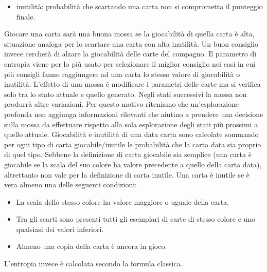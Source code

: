 \documentclass{article}
\begin{document}
\begin{flushleft}
\begin{itemize}
    \item inutilità: probabilità che scartando una carta non si comprometta il punteggio finale.
\end{itemize}
Giocare una carta sarà una buona mossa se la giocabilità di quella carta è alta, situazione analoga per lo scartare una carta con alta inutilità. Un buon consiglio invece cercherà di alzare la giocabilità delle carte del compagno. Il parametro di entropia viene per lo più usato per selezionare il miglior consiglio nei casi in cui più consigli fanno raggiungere ad una carta lo stesso valore di giocabilità o inutilità.\newline
\newline
L'effetto di una mossa è modificare i parametri delle carte ma si verifica solo tra lo stato attuale e quello generato. Negli stati successivi la mossa non produrrà altre variazioni.\newline
Per questo motivo riteniamo che un'esplorazione profonda non aggiunga informazioni rilevanti che aiutino a prendere una decisione sulla mossa da effettuare rispetto alla sola esplorazione degli stati più prossimi a quello attuale. \newline
\newline
Giocabilità e inutilità di una data carta sono calcolate sommando per ogni tipo di carta giocabile/inutile le probabilità che la carta data sia proprio di quel tipo. \newline
Sebbene la definizione di carta giocabile sia semplice (una carta è giocabile se la scala del suo colore ha valore precedente a quello della carta data), altrettanto non vale per la definizione di carta inutile. Una carta è inutile se è vera almeno una delle seguenti condizioni:
\begin{itemize}
    \item La scala dello stesso colore ha valore maggiore o uguale della carta.
    \item Tra gli scarti sono presenti tutti gli esemplari di carte di stesso colore e uno qualsiasi dei valori inferiori.
    \item Almeno una copia della carta è ancora in gioco.
\end{itemize}
\end{flushleft}
L'entropia invece è calcolata secondo la formula classica.
\end{document}
